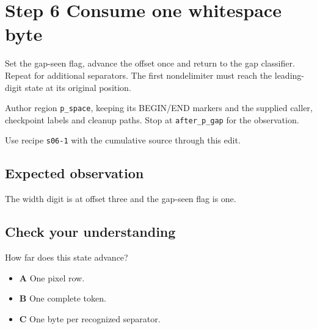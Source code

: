 \section{Step 6 Consume one whitespace byte}\label{ppm-s06}

Set the gap-seen flag, advance the offset once and return to the gap classifier. Repeat for additional separators. The first nondelimiter must reach the leading-digit state at its original position.

Author region \texttt{p\_space}, keeping its BEGIN/END markers and the supplied caller, checkpoint labels and cleanup paths. Stop at \texttt{after\_p\_gap} for the observation.

Use recipe \texttt{s06-1} with the cumulative source through this edit.

\subsection{Expected observation}
The width digit is at offset three and the gap-seen flag is one.

\subsection{Check your understanding}
How far does this state advance?

\begin{itemize}
  \item \textbf{A} One pixel row.
  \item \textbf{B} One complete token.
  \item \textbf{C} One byte per recognized separator.
\end{itemize}
